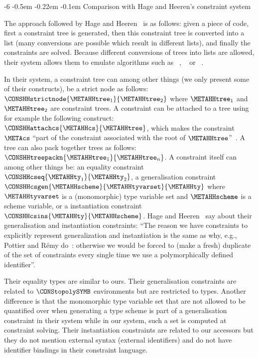 \documentclass{jfp1}
\makeatletter
\def\subsubsection{\@startsection{subsubsection}{3}{\z@}{-0.2\baselineskip plus -0.1\baselineskip minus -0.1\baselineskip}%
    {-0.5em \@plus -0.22em \@minus -0.1em}{\normalfont\normalsize\bfseries}}%
\newcommand{\sectiontitledot}[1]{#1.}
\renewcommand\subsubsection{\@startsection{subsubsection}{3}{\z@}%
                            {-6\p@ \@plus -1\p@ \@minus -1\p@}%
                            {-0.5em \@plus -0.22em \@minus -0.1em}%
                            {\normalfont\normalsize\bfseries\boldmath\sectiontitledot}}
\makeatother
\begin{document}
\subsubsection{Comparison with Hage and Heeren's constraint system}


The approach followed by Hage and
Heeren~\cite{Heeren:2005,Heeren+Hage+Swierstra:2003a,Hage+Heeren:2005a,Hage+Heeren:2009}
is as follows: given a piece of code, first a constraint tree is
generated, then this constraint tree is converted into a list (many
conversions are possible which result in different lists), and finally
the constraints are solved.  Because different conversions of trees
into lists are allowed, their system allows them to emulate algorithms
such as \walgo~\cite{Damas+Milner:1982}, \malgo~\cite{Lee+Yi:1998} or
\uaealgo~\cite{Yang:2000}.
%

In their system, a constraint tree can among other things (we only
present some of their constructs), be a strict node as follows:
$\CONSHHstrictnode{\METAHHtree_1}{\METAHHtree_2}$ where
$\METAHHtree_1$ and $\METAHHtree_2$ are constraint trees.  A
constraint can be attached to a tree using for example the following
construct: $\CONSHHattachcs{\METAHHcs}{\METAHHtree}$, which makes the
constraint $\METAcs$ ``part of the constraint associated with the root
of $\METAHHtree$''~\cite{Hage+Heeren:2009}.  A tree can also pack
together trees as follows:
$\CONSHHtreepackn{\METAHHtree_1}{\METAHHtree_n}$.  A constraint itself
can among other things be: an equality constraint
$\CONSHHcseq{\METAHHty_1}{\METAHHty_2}$, a generalisation constraint
$\CONSHHcsgen{\METAHHscheme}{\METAHHtyvarset}{\METAHHty}$ where
$\METAHHtyvarset$ is a (monomorphic) type variable set and
$\METAHHscheme$ is a scheme variable, or a instantiation constraint
$\CONSHHcsins{\METAHHty}{\METAHHscheme}$.  Hage and
Heeren~\cite{Hage+Heeren:2009} say about their generalisation and
instantiation constraints: ``The reason we have constraints to
explicitly represent generalization and instantiation is the same as
why, e.g., Pottier and R\'emy do~\cite{Pottier+Remy:2005}: otherwise
we would be forced to (make a fresh) duplicate of the set of
constraints every single time we use a polymorphically defined
identifier''.
%

Their equality types are similar to ours.  Their generalisation
constraints are related to $\CONStopolySYMB$ environments but are
restricted to types.  Another difference is that the monomorphic type
variable set that are not allowed to be quantified over when
generating a type scheme is part of a generalisation constraint in
their system while in our system, such a set is computed at constraint
solving.  Their instantiation constraints are related to our accessors
but they do not mention external syntax (external identifiers) and do
not have identifier bindings in their constraint language.
%
\end{document}

